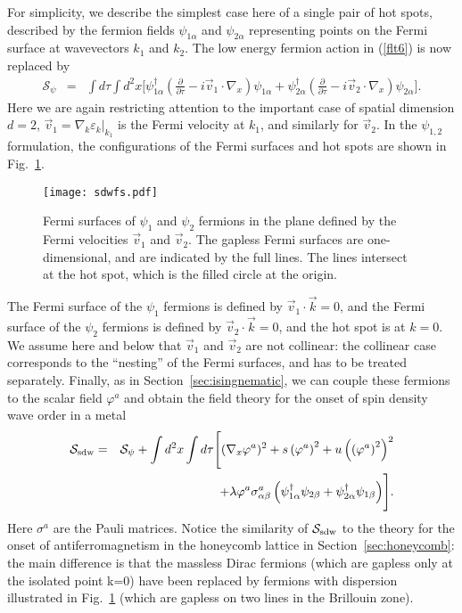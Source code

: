 \documentclass[10pt, oneside]{book}
\begin{document}
\begin{doublespace}
For simplicity, we describe the simplest case here of a single pair of hot spots, described by the fermion fields $\psi_{1\alpha}$ and $\psi_{2\alpha}$ representing
points on the Fermi surface at wavevectors $k_1$ and $k_2$. 
The low energy fermion action in (\ref{flt6}) is now replaced by
\begin{eqnarray}
\mathcal{S}_\psi &=& \int d \tau \int d^2 x \Biggl[ \psi_{1\alpha}^\dagger \left( \frac{\partial}{\partial \tau} - i \vec{v}_1 \cdot \nabla_x \right) \psi_{1\alpha} + \psi_{2\alpha}^\dagger  \left( \frac{\partial}{\partial \tau} - i \vec{v}_2 \cdot \nabla_x \right) \psi_{2\alpha} \Biggr] .
\label{sdw2}
\end{eqnarray}
Here we are again restricting attention to the important case of spatial dimension $d=2$,
$\vec{v}_1 = \left. \nabla_k \varepsilon_{k} \right |_{k_1}$ is the Fermi velocity at ${k}_1$, and similarly for $\vec{v}_2$. 
In the $\psi_{1,2}$  formulation, the configurations of the Fermi surfaces and hot spots
are shown in Fig.~\ref{fig:sdwfs}.
\begin{figure}[t]
\centering
 \texttt{[image: sdwfs.pdf]}
 \caption{Fermi surfaces of $\psi_1$ and $\psi_2$ fermions in the plane defined by the Fermi velocities $\vec{v}_1$ 
 and $\vec{v}_2$. The gapless Fermi surfaces are one-dimensional, and are indicated by the full lines. The lines intersect at the hot spot, which is the filled circle at the origin.}
 \label{fig:sdwfs}
\end{figure}
The Fermi surface of the $\psi_1$ fermions is defined by $\vec{v}_1 \cdot \vec{k} = 0$,
and the Fermi surface of the $\psi_2$ fermions is defined by $\vec{v}_2 \cdot \vec{k} = 0$,
and the hot spot is at $k=0$.
We assume here and below that $\vec{v}_1$ and $\vec{v}_2$ are not collinear: the collinear case corresponds
to the ``nesting'' of the Fermi surfaces, and has to be treated separately.
Finally, as in Section~\ref{sec:isingnematic}, we can couple these fermions to the scalar field $\varphi^a$ and obtain
the field theory for the onset of spin density wave order in a metal \cite{chubukov1}
\begin{eqnarray}
\mathcal{S}_{{\rm sdw}} &=& \mathcal{S}_\psi + \int d^2 x \int d \tau \Biggl[  (\nabla_x \varphi^a)^2 + s \left(\varphi^{a}\right)^2
+ u \left( \left(\varphi^a \right)^2 \right)^2 \nonumber \\
&~&~~~~~+ \lambda \varphi^a \sigma^{a}_{\alpha\beta} \left(
\psi_{1\alpha}^\dagger \psi_{2\beta} + \psi_{2\alpha}^\dagger \psi_{1\beta} \right) \Biggr]. \label{sdw3}
\end{eqnarray}
Here $\sigma^a$ are the Pauli matrices. Notice the similarity of $\mathcal{S}_{{\rm sdw}}$ to the theory for the onset of antiferromagnetism
in the honeycomb lattice in Section~\ref{sec:honeycomb}: the main difference is that the massless Dirac fermions (which are gapless only at the isolated
point k=0) have been replaced by fermions with dispersion illustrated in Fig.~\ref{fig:sdwfs} (which are gapless on two lines in the Brillouin zone).


\end{doublespace}
\end{document}
